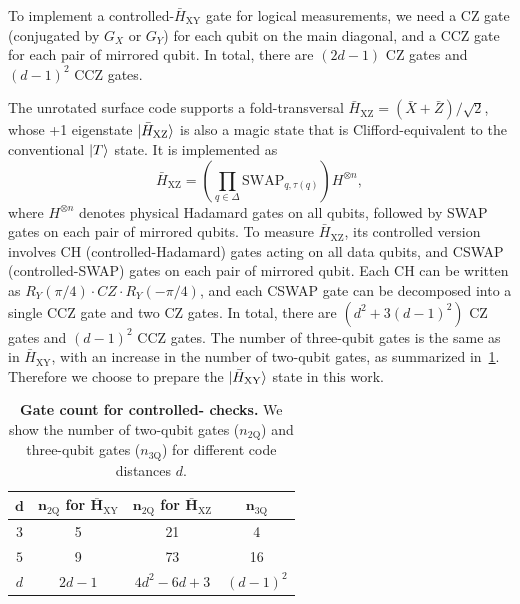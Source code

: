 \documentclass[%
    aps, 
    physrev,
    reprint,
]{revtex4-2}
\newcommand{\XY}{_\mathrm{XY}}
\begin{document}
To implement a controlled-$\bar{H}\XY$ gate for logical measurements, we need a CZ gate (conjugated by $G_X$ or $G_Y$) for each qubit on the main diagonal, and a CCZ gate for each pair of mirrored qubit. 
In total, there are $(2d-1)$ CZ gates and $(d-1)^2$ CCZ gates.

The unrotated surface code supports a fold-transversal
$\bar{H}_\mathrm{XZ} = (\bar{X} + \bar{Z})/\sqrt 2$, whose +1 eigenstate $\ket{\bar{H}_\mathrm{XZ}}$ is also a magic state that is Clifford-equivalent to the conventional $\ket T$ state. 
It is implemented as 
\begin{equation}
    \bar{H}_\mathrm{XZ}
    =
    \left(\prod_{q \in \Delta} \mathrm{SWAP}_{q, \tau(q)} \right) H^{\otimes n}
    ,
\end{equation}
where $H^{\otimes n}$ denotes physical Hadamard gates on all qubits, followed by SWAP gates on each pair of mirrored qubits. 
To measure $\bar{H}_\mathrm{XZ}$, its controlled version involves CH (controlled-Hadamard) gates acting on all data qubits, and CSWAP (controlled-SWAP) gates on each pair of mirrored qubit. 
Each CH can be written as $R_Y(\pi/4)\cdot CZ\cdot R_Y(-\pi/4)$, and each CSWAP gate can be decomposed into a single CCZ gate and two CZ gates. 
In total, there are $(d^2+3(d-1)^2)$ CZ gates and $(d-1)^2$ CCZ gates. 
The number of three-qubit gates is the same as in $\bar{H}\XY$, with an increase in the number of two-qubit gates, as summarized in~\cref{table:GateCounts}. 
Therefore we choose to prepare the $\ket{\bar{H}\XY}$ state in this work.

\begin{table}
\centering
    \begin{tabular}{|c|c|c|c|}
        \hline
        $\boldsymbol{d}$ & $\boldsymbol{n_\mathrm{2Q}}$ \textbf{for} $\boldsymbol{\bar{H}\XY}$ & $\boldsymbol{n_\mathrm{2Q}}$ \textbf{for} $\boldsymbol{\bar{H}_\mathrm{XZ}}$ & $\boldsymbol{n_\mathrm{3Q}}$ \\
        \hline
        $3$ & 5 & 21 & 4 \\
        \hline
        $5$ & 9 & 73 & 16 \\
        \hline
        $d$ & $2d-1$ & $4d^2-6d+3$ & $(d-1)^2$\\
        \hline
    \end{tabular}
    \caption{
        \textbf{Gate count for controlled- checks.}
        We show the number of two-qubit gates ($n_\mathrm{2Q}$) and three-qubit gates ($n_\mathrm{3Q}$) for different code distances $d$.
        }
    \label{table:GateCounts}
\end{table}
\end{document}
